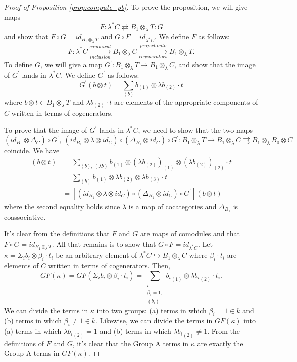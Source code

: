 \begin{proof}[Proof of Proposition \ref{prop:compute_pb}]
To prove the proposition, 
we will give maps
$$
F: \lambda^*C \rightleftarrows B_1 \otimes_{\lambda} T:G
$$
and show that $F\circ G = id_{B_1 \otimes_{\lambda} T}$ 
and $G \circ F = id_{\lambda^*C}$.
We define $F$ as follows: 
$$
F:\lambda^*C 
\xrightarrow[inclusion]{canonical}
B_1 \otimes_{\lambda} C
\xrightarrow[cogenerators]{project\;onto}
B_1 \otimes_{\lambda} T.
$$
To define $G$, we will give a map 
$G^\prime: B_1 \otimes_{\lambda} T \to 
B_1 \otimes_{\lambda} C$, and show that the image of 
$G^\prime$ lands in $\lambda^*C$. We define 
$G^\prime$ as follows:
$$
G^\prime(b \otimes t) = 
\sum \limits_{(b)} b_{(1)} \otimes \lambda b_{(2)} \cdot t
$$
where $b \otimes t \in B_1 \otimes_{\lambda} T$ and $\lambda 
b_{(2)} \cdot t$ are elements of the 
appropriate components of $C$ 
written in terms of cogenerators.

To prove that the image of $G^\prime$ lands in 
$\lambda^*C$, we need to show that the two maps 
$$
(id_{B_1}\otimes \Delta_{C}) \circ G^\prime, \>
(id_{B_1}\otimes \lambda \otimes id_C)\circ 
(\Delta_{B_1}\otimes id_C) \circ G^\prime: 
B_1 \otimes_{\lambda} T
\to B_1 \otimes_{\lambda} C
\rightrightarrows
B_1 \otimes_{\lambda} B_0 \otimes C
$$
coincide. We have
\begin{align*}
[(1\otimes \Delta_{C}) \circ G^\prime](b \otimes t) 
&= 
\sum \limits_{(b),\, (\lambda b)} b_{(1)} \otimes 
(\lambda b_{(2)})_{(1)} \otimes 
(\lambda b_{(2)})_{(2)} \cdot t \\
&= 
\sum \limits_{(b)} b_{(1)} \otimes 
\lambda b_{(2)} \otimes 
\lambda b_{(3)} \cdot t \\
&= 
[(id_{B_1}\otimes \lambda \otimes id_C)\circ 
(\Delta_{B_1}\otimes id_C) \circ G^\prime]
(b\otimes t)
\end{align*}
where the second equality holds since $\lambda$ 
is a map of cocategories
and $\Delta_{B_1}$ is coassociative.

It's clear from the definitions that $F$ and $G$ are 
maps of comodules and that 
$F\circ G = id_{B_1\otimes_{\lambda} T}$. All that remains 
is to show that $G \circ F = id_{\lambda^*C}$. 
Let $\kappa = \Sigma_i b_i \otimes \beta_i \cdot t_i$ be an 
arbitrary element of $\lambda^*C \hookrightarrow 
B_1 \otimes_{\lambda} C$ where $\beta_i \cdot t_i$ are elements 
of $C$ written in terms of cogenerators. 
Then, 
\begin{equation*}
GF(\kappa) = 
GF(\Sigma_i b_i \otimes \beta_i \cdot t_i) = 
\sum \limits_{\substack{i, \\ \beta_i = 1, \\ (b_i)}} 
{b_i}_{(1)} \otimes \lambda {b_i}_{(2)} 
\cdot t_i.
\end{equation*}
We can divide the terms in $\kappa$ into two groups: 
(a) terms in which $\beta_i = 1 \in k$ and (b) terms in which $\beta_i
\neq 1 \in k$. Likewise, we can divide the terms in 
$GF(\kappa)$ into (a) terms in which $\lambda {b_i}_{(2)} = 1$ 
and (b) terms in which $\lambda {b_i}_{(2)} \neq 1$. 
From the definitions of $F$ and $G$, it's clear that 
the Group A terms in $\kappa$ are exactly the Group A 
terms in $GF(\kappa)$. 


\end{proof}
